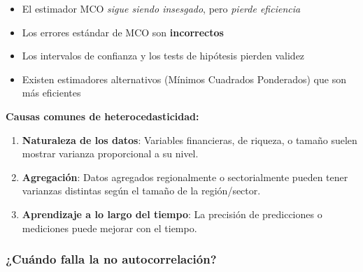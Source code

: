 \documentclass[11pt,a4paper]{article}
\begin{document}
\begin{itemize}
\item El estimador MCO \emph{sigue siendo insesgado}, pero \emph{pierde eficiencia}
\item Los errores estándar de MCO son \textbf{incorrectos}
\item Los intervalos de confianza y los tests de hipótesis pierden validez
\item Existen estimadores alternativos (Mínimos Cuadrados Ponderados) que son más eficientes
\end{itemize}

\noindent\textbf{Causas comunes de heterocedasticidad:}

\begin{enumerate}
\item \textbf{Naturaleza de los datos}: Variables financieras, de riqueza, o tamaño suelen mostrar varianza proporcional a su nivel.

\item \textbf{Agregación}: Datos agregados regionalmente o sectorialmente pueden tener varianzas distintas según el tamaño de la región/sector.

\item \textbf{Aprendizaje a lo largo del tiempo}: La precisión de predicciones o mediciones puede mejorar con el tiempo.
\end{enumerate}

\subsubsection*{¿Cuándo falla la no autocorrelación?}
\end{document}
